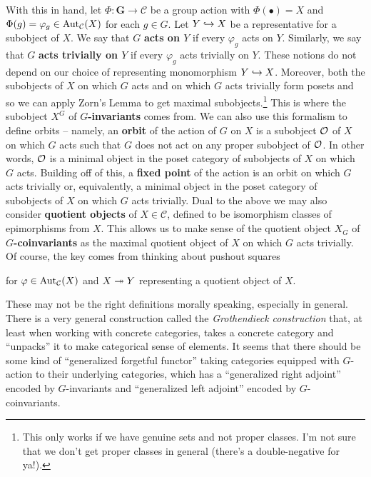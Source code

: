 \documentclass[11pt]{article}
\newcommand{\CC}{\mathcal{C}}
\renewcommand{\phi}{\varphi}
\begin{document}
With this in hand, let $\Phi: \mathbf{G}\to\CC$ be a group action with $\Phi(\bullet)=X$ and $\Phi(g)=\phi_g\in\Aut_{\CC}(X)$ for each $g\in G$. Let $Y\hookrightarrow X$ be a representative for a subobject of $X$. We say that $G$ \textbf{acts on $Y$} if every $\phi_g$ acts on $Y$. Similarly, we say that $G$ \textbf{acts trivially on $Y$} if every $\phi_g$ acts trivially on $Y$. These notions do not depend on our choice of representing monomorphism $Y\hookrightarrow X$. Moreover, both the subobjects of $X$ on which $G$ acts and on which $G$ acts trivially form posets and so we can apply Zorn's Lemma to get maximal subobjects.\footnote{This only works if we have genuine sets and not proper classes. I'm not sure that we don't get proper classes in general (there's a double-negative for ya!).} This is where the subobject $X^G$ of \textbf{$G$-invariants} comes from. We can also use this formalism to define orbits -- namely, an \textbf{orbit} of the action of $G$ on $X$ is a subobject $\mathcal{O}$ of $X$ on which $G$ acts such that $G$ does not act on any proper subobject of $\mathcal{O}$. In other words, $\mathcal{O}$ is a minimal object in the poset category of subobjects of $X$ on which $G$ acts. Building off of this, a \textbf{fixed point} of the action is an orbit on which $G$ acts trivially or, equivalently, a minimal object in the poset category of subobjects of $X$ on which $G$ acts trivially. Dual to the above we may also consider \textbf{quotient objects} of $X\in\CC$, defined to be isomorphism classes of epimorphisms from $X$. This allows us to make sense of the quotient object $X_G$ of \textbf{$G$-coinvariants} as the maximal quotient object of $X$ on which $G$ acts trivially. Of course, the key comes from thinking about pushout squares
\begin{center}
\end{center}
for $\phi\in\Aut_{\CC}(X)$ and $X\twoheadrightarrow Y$ representing a quotient object of $X$.

\begin{remark}
These may not be the right definitions morally speaking, especially in general. There is a very general construction called the \emph{Grothendieck construction} that, at least when working with concrete categories, takes a concrete category and ``unpacks'' it to make categorical sense of elements. It seems that there should be some kind of ``generalized forgetful functor'' taking categories equipped with $G$-action to their underlying categories, which has a ``generalized right adjoint'' encoded by $G$-invariants and ``generalized left adjoint'' encoded by $G$-coinvariants.
\end{remark}
\end{document}
